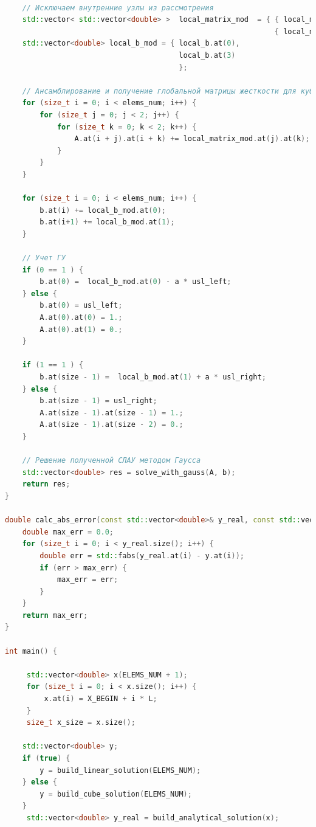 \begin{lstlisting}[language=c++, label=prog,caption={\textit{Реализация МКЭ}}]
    
    // Исключаем внутренние узлы из рассмотрения
    std::vector< std::vector<double> >  local_matrix_mod  = { { local_matrix.at(0).at(0), local_matrix.at(0).at(3) },
                                                              { local_matrix.at(3).at(0), local_matrix.at(3).at(3) } };
    std::vector<double> local_b_mod = { local_b.at(0), 
                                        local_b.at(3)
                                        };
    
    // Ансамблирование и получение глобальной матрицы жесткости для кубического КЭ
    for (size_t i = 0; i < elems_num; i++) {
        for (size_t j = 0; j < 2; j++) {
            for (size_t k = 0; k < 2; k++) {
                A.at(i + j).at(i + k) += local_matrix_mod.at(j).at(k);
            }
        }
    }

    for (size_t i = 0; i < elems_num; i++) {
        b.at(i) += local_b_mod.at(0);
        b.at(i+1) += local_b_mod.at(1);
    }
       
    // Учет ГУ
    if (0 == 1 ) {
        b.at(0) =  local_b_mod.at(0) - a * usl_left;
    } else {
        b.at(0) = usl_left;
        A.at(0).at(0) = 1.;
        A.at(0).at(1) = 0.;
    }

    if (1 == 1 ) {
        b.at(size - 1) =  local_b_mod.at(1) + a * usl_right;
    } else {
        b.at(size - 1) = usl_right;
        A.at(size - 1).at(size - 1) = 1.;
        A.at(size - 1).at(size - 2) = 0.;
    }
    
    // Решение полученной СЛАУ методом Гаусса
    std::vector<double> res = solve_with_gauss(A, b);
    return res;
}

double calc_abs_error(const std::vector<double>& y_real, const std::vector<double>& y) {
    double max_err = 0.0;
    for (size_t i = 0; i < y_real.size(); i++) {
        double err = std::fabs(y_real.at(i) - y.at(i));
        if (err > max_err) {
            max_err = err;
        }
    }
    return max_err;
}

int main() {

     std::vector<double> x(ELEMS_NUM + 1);
     for (size_t i = 0; i < x.size(); i++) {
         x.at(i) = X_BEGIN + i * L;
     }
     size_t x_size = x.size();

    std::vector<double> y;
    if (true) {
        y = build_linear_solution(ELEMS_NUM);
    } else {
        y = build_cube_solution(ELEMS_NUM);
    }
     std::vector<double> y_real = build_analytical_solution(x);
    


\end{lstlisting}
